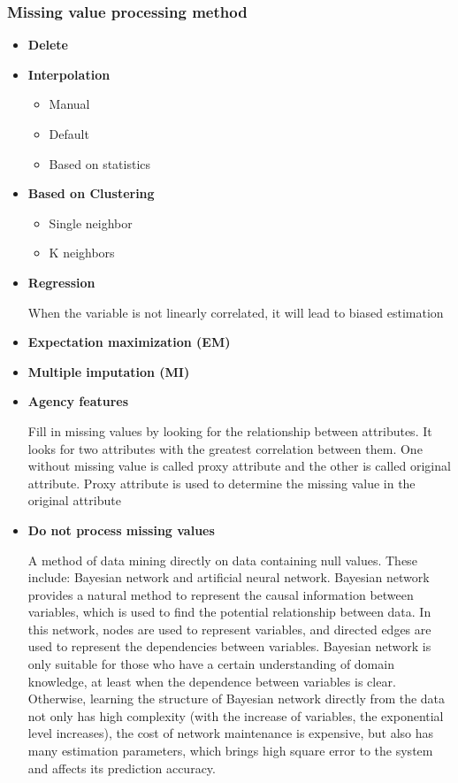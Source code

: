 \subsubsection{Missing value processing method}
\begin{itemize}
\item \textbf{Delete}
\item \textbf{Interpolation}
\begin{itemize}
\item Manual
\item Default
\item Based on statistics
\end{itemize}
\item \textbf{Based on Clustering}
\begin{itemize}
\item Single neighbor
\item K neighbors
\end{itemize}
\item \textbf{Regression}

When the variable is not linearly correlated, it will lead to biased estimation

\item \textbf{Expectation maximization (EM)}

\item \textbf{Multiple imputation (MI)}

\item \textbf{Agency features}

Fill in missing values by looking for the relationship between attributes. It looks for two attributes with the greatest correlation between them. One without missing value is called proxy attribute and the other is called original attribute. Proxy attribute is used to determine the missing value in the original attribute

\item \textbf{Do not process missing values}

A method of data mining directly on data containing null values. These include: Bayesian network and artificial neural network. Bayesian network provides a natural method to represent the causal information between variables, which is used to find the potential relationship between data. In this network, nodes are used to represent variables, and directed edges are used to represent the dependencies between variables. Bayesian network is only suitable for those who have a certain understanding of domain knowledge, at least when the dependence between variables is clear. Otherwise, learning the structure of Bayesian network directly from the data not only has high complexity (with the increase of variables, the exponential level increases), the cost of network maintenance is expensive, but also has many estimation parameters, which brings high square error to the system and affects its prediction accuracy.

\end{itemize}


